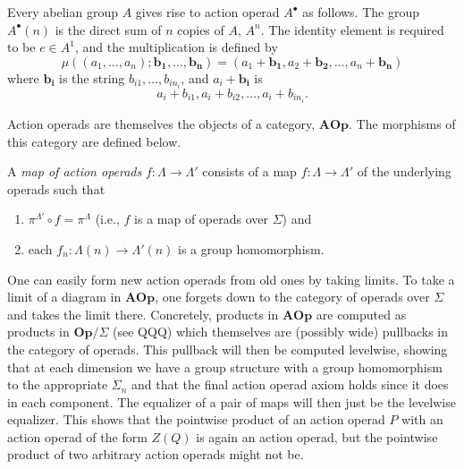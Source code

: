 \documentclass{amsbook} %
\newcommand{\mb}{\mathbf}
\numberwithin{section}{chapter}
\begin{document}


\begin{example}
Every abelian group $A$ gives rise to action operad $A^{\bullet}$ as follows.  The group $A^{\bullet}(n)$ is the direct sum of $n$ copies of $A$, $A^{n}$.  The identity element is required to be $e \in A^{1}$, and the multiplication is defined by
\[
\mu((a_{1}, \ldots, a_{n}); \mb{b_{1}}, \ldots, \mb{b_{n}}) = (a_{1}+\mb{b_{1}}, a_{2} + \mb{b_{2}}, \ldots, a_{n} + \mb{b_{n}})
\]
where $\mb{b_{i}}$ is the string $b_{i1}, \ldots, b_{in_{i}}$, and $a_{i} + \mb{b_{i}}$ is
\[
a_{i} + b_{i1}, a_{i} + b_{i2}, \ldots, a_{i} + b_{in_{i}}.
\]
\end{example}


Action operads are themselves the objects of a category, $\mb{AOp}$.  The morphisms of this category are defined below.
\begin{Defi}\label{mapaop}
A \textit{map of action operads} $f: \Lambda \rightarrow \Lambda'$ consists of a map $f:\Lambda \rightarrow \Lambda'$ of the underlying operads such that
\begin{enumerate}
\item $\pi^{\Lambda'} \circ f = \pi^{\Lambda}$ (i.e., $f$ is a map of operads over $\Sigma$) and
\item each $f_{n}:\Lambda(n) \rightarrow \Lambda'(n)$ is a group homomorphism.
\end{enumerate}
\end{Defi}



\begin{example}
One can easily form new action operads from old ones by taking limits.  To take a limit of a diagram in $\mb{AOp}$, one forgets down to the category of operads over $\Sigma$ and takes the limit there.  Concretely, products in $\mb{AOp}$ are computed as products in $\mb{Op}/\Sigma$ (see QQQ) 
which themselves are (possibly wide) pullbacks in the category of operads.  This pullback will then be computed levelwise, showing that at each dimension we have a group structure with a group homomorphism to the appropriate $\Sigma_{n}$ and that the final action operad axiom holds since it does in each component.  The equalizer of a pair of maps will then just be the levelwise equalizer.  This shows that the pointwise product of an action operad $P$ with an action operad of the form $Z(Q)$ is again an action operad, but the pointwise product of two arbitrary action operads might not be.
\end{example}
\end{document}

